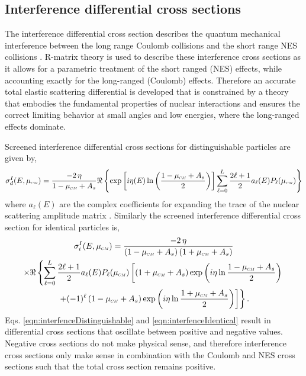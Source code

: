 \subsection{Interference differential cross sections}
The interference differential cross section describes the quantum mechanical interference between the long range Coulomb collisions and the short range NES collisions \cite{Hale-1983}. R-matrix theory is used to describe these interference cross sections as it allows for a parametric treatment of the short ranged (NES) effects, while accounting exactly for the long-ranged (Coulomb) effects. Therefore an accurate total elastic scattering differential is developed that is constrained by a theory that embodies the fundamental properties of nuclear interactions and ensures the correct limiting behavior at small angles and low energies, where the long-ranged effects dominate.

Screened interference differential cross sections for distinguishable particles are given by,
\begin{equation} \label{eqn:interfenceDistinguishable}
    \sigma_d^I(E,\mucm) = \dfrac{-2 \, \eta}{1 - \mucm + A_s} \Re \left\lbrace \exp \left[ i \eta(E) \ln \left( \dfrac{1 - \mucm + A_s}{2} \right) \right]\sum\limits_{\ell = 0}^L \dfrac{2\ell + 1}{2} a_{\ell}(E) P_{\ell}(\mucm) \right\rbrace
\end{equation}
where $a_{\ell}(E)$ are the complex coefficients for expanding the trace of the nuclear scattering amplitude matrix \cite{Brown-2018}. Similarly the screened interference differential cross section for identical particles is,
\begin{multline} \label{eqn:interfenceIdentical}
    \sigma_i^I(E,\mucm) = \dfrac{-2 \, \eta}{\left(1 - \mucm + A_s\right)\left(1 + \mucm + A_s\right)} \\
    \times \Re \left\lbrace \sum\limits_{\ell = 0}^L \dfrac{2 \ell + 1}{2} a_{\ell}(E) P_{\ell}(\mucm) \left[ \left(1 + \mucm + A_s \right) \exp\left(i \eta \ln \dfrac{1 - \mucm + A_s}{2}\right) \right.\right. \\ \left.\left. + (-1)^{\ell} \left(1 - \mucm + A_s \right) \exp\left(i \eta \ln \dfrac{1 + \mucm + A_s}{2}\right) \right]\right\rbrace.
\end{multline}
Eqs. \eqref{eqn:interfenceDistinguishable} and \eqref{eqn:interfenceIdentical} result in differential cross sections that oscillate between positive and negative values. Negative cross sections do not make physical sense, and therefore interference cross sections only make sense in combination with the Coulomb and NES cross sections such that the total cross section remains positive.

